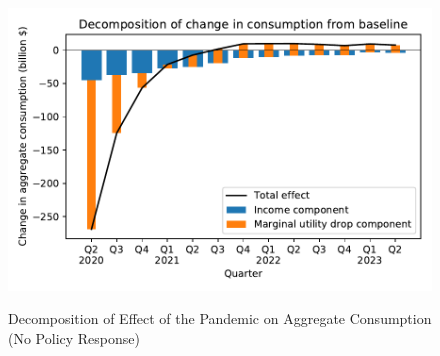 \documentclass[titlepage,a4paper]{\econtex}
\begin{document}
\begin{figure}
  \centering
  \caption{Decomposition of Effect of the Pandemic on Aggregate Consumption (No Policy Response)}
  \label{cons_response2}
  { \includegraphics[width=8in]{./Figures/Decomposition}}
\end{figure}
\end{document}
